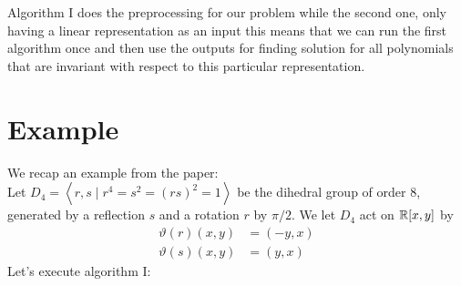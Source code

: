 \documentclass[]{article}
\begin{document}
Algorithm I does the preprocessing for our problem while the second one, only having a linear representation as an input
this means that we can run the first algorithm once and then 
use the outputs for finding solution for 
all polynomials that are invariant with respect to this particular representation.


\section{Example}
We recap an example from the paper:\\
Let $D_4=\left<r,s\mid r^4=s^2=(rs)^2=1\right>$ be the dihedral group of order $8$, generated by a reflection $s$ and a rotation $r$ by $\pi/2$. We let $D_4$ act on $\mathbb R[x,y]$ by 
\begin{align*}
    \vartheta(r)(x,y)&=(-y,x)\\
    \vartheta(s)(x,y)&=(y,x)
\end{align*}
Let's execute algorithm I:
\end{document}
